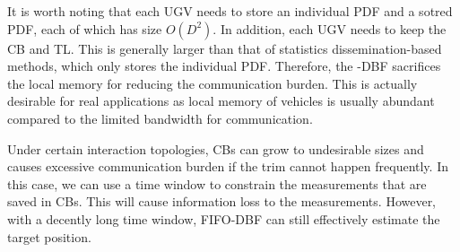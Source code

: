 	It is worth noting that each UGV needs to store an individual PDF and a sotred PDF, each of which has size $O(D^2)$. 
	In addition, each UGV needs to keep the CB and TL.
	This is generally larger than that of statistics dissemination-based methods, which only stores the individual PDF.
	Therefore, the \proto-DBF sacrifices the local memory for reducing the communication burden. 
	This is actually desirable for real applications as local memory of vehicles is usually abundant compared to the limited bandwidth for communication.
	
	
	\begin{rem}
		Under certain interaction topologies, CBs can grow to undesirable sizes and causes excessive communication burden if the trim cannot happen frequently.
		In this case, we can use a time window to constrain the measurements that are saved in CBs.
		This will cause information loss to the measurements.
		However, with a decently long time window, FIFO-DBF can still effectively estimate the target position.
	\end{rem}